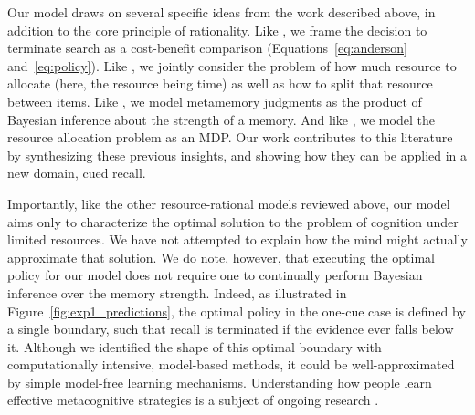 Our model draws on several specific ideas from the work described above, in addition to the core principle of rationality. Like \citet{anderson1989human}, we frame the decision to terminate search as a cost-benefit comparison (Equations~\ref{eq:anderson} and~\ref{eq:policy}). Like \citet{berg2018resourcerational}, we jointly consider the problem of how much resource to allocate (here, the resource being time) as well as how to split that resource between items. Like \citet{hu2021bayesian}, we model metamemory judgments as the product of Bayesian inference about the strength of a memory. And like \citet{suchow2016deciding}, we model the resource allocation problem as an MDP. Our work contributes to this literature by synthesizing these previous insights, and showing how they can be applied in a new domain, cued recall.


Importantly, like the other resource-rational models reviewed above, our model aims only to characterize the optimal solution to the problem of cognition under limited resources. We have not attempted to explain how the mind might actually approximate that solution. We do note, however, that executing the optimal policy for our model does not require one to continually perform Bayesian inference over the memory strength. Indeed, as illustrated in Figure~\ref{fig:exp1_predictions}, the optimal policy in the one-cue case is defined by a single boundary, such that recall is terminated if the evidence ever falls below it. Although we identified the shape of this optimal boundary with computationally intensive, model-based methods, it could be well-approximated by simple model-free learning mechanisms. Understanding how people learn effective metacognitive strategies is a subject of ongoing research \citep{lieder2018rational,jain2019how,callaway2022leveraging,binz2022heuristics,he2022where}.


